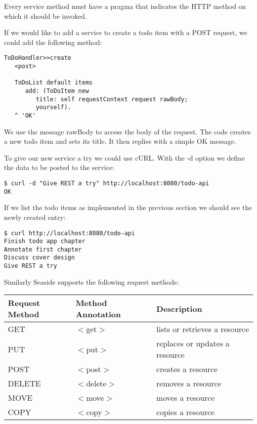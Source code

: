 \documentclass[a4paper,10pt,twoside]{book}
\newcommand{\ct}[1]{{\small\ttfamily\textup{#1}}}
\begin{document}
Every service method must have a pragma that indicates the HTTP method on which it should be invoked.

If we would like to add a service to create a todo item with a POST request, we could add the following method:

\begin{lstlisting}
ToDoHandler>>create
   <post>
	
   ToDoList default items
      add: (ToDoItem new
         title: self requestContext request rawBody;
         yourself).
   ^ 'OK'
\end{lstlisting}

We use the message \ct{rawBody} to access the body of the request. The code creates a new todo item and sets its title. It then replies with a simple \ct{OK} message.

To give our new service a try we could use cURL. With the \ct{-d} option we define the data to be posted to the service:

\begin{lstlisting}
$ curl -d "Give REST a try" http://localhost:8080/todo-api
OK
\end{lstlisting}

If we list the todo items as implemented in the previous section we should see the newly created entry:

\begin{lstlisting}
$ curl http://localhost:8080/todo-api
Finish todo app chapter
Annotate first chapter
Discuss cover design
Give REST a try
\end{lstlisting}

Similarly Seaside supports the following request methods:

\begin{tabularx}{\textwidth}{XXX}
\textbf{ Request Method }&\textbf{ Method Annotation }&\textbf{ Description  }\\ \hline
 GET & \ct{$<$get$>$} & lists or retrieves a resource \index{REST!GET} \index{get}\\
 PUT & \ct{$<$put$>$} & replaces or updates a resource \index{REST!PUT} \index{put}\\
 POST & \ct{$<$post$>$} & creates a resource \index{REST!POST} \index{post}\\
 DELETE & \ct{$<$delete$>$} & removes a resource \index{REST!DELETE} \index{delete}\\
 MOVE & \ct{$<$move$>$} & moves a resource \index{REST!MOVE} \index{move}\\
 COPY & \ct{$<$copy$>$} & copies a resource \index{REST!COPY} \index{copy}\\
\end{tabularx}
\end{document}
